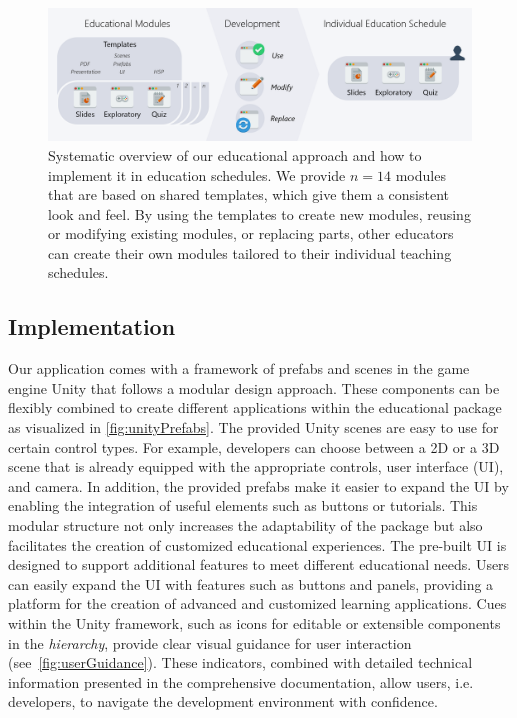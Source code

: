 \begin{figure}[t!bh]
	\centering
	\includegraphics[width=\linewidth]{pictures/modularApproach.png}
	\captionsetup{labelfont=bf,textfont=it}
	\caption{Systematic overview of our educational approach and how to implement it in education schedules. We provide $n=14$ modules that are based on shared templates, which give them a consistent look and feel. By using the templates to create new modules, reusing or modifying existing modules, or replacing parts, other educators can create their own modules tailored to their individual teaching schedules.\label{fig:modularApproach}}
\end{figure}
\subsection{Implementation}

Our application comes with a framework of prefabs and scenes in the game engine Unity that follows a modular design approach. These components can be flexibly combined to create different applications within the educational package as visualized in \autoref{fig:unityPrefabs}. The provided Unity scenes are easy to use for certain control types. For example, developers can choose between a 2D or a 3D scene that is already equipped with the appropriate controls, user interface (UI), and camera. In addition, the provided prefabs make it easier to expand the UI by enabling the integration of useful elements such as buttons or tutorials. This modular structure not only increases the adaptability of the package but also facilitates the creation of customized educational experiences.
The pre-built UI is designed to support additional features to meet different educational needs. Users can easily expand the UI with features such as buttons and panels, providing a platform for the creation of advanced and customized learning applications.
Cues within the Unity framework, such as icons for editable or extensible components in the \emph{hierarchy}, provide clear visual guidance for user interaction (see~\autoref{fig:userGuidance}). These indicators, combined with detailed technical information presented in the comprehensive documentation, allow users, i.e. developers, to navigate the development environment with confidence.

